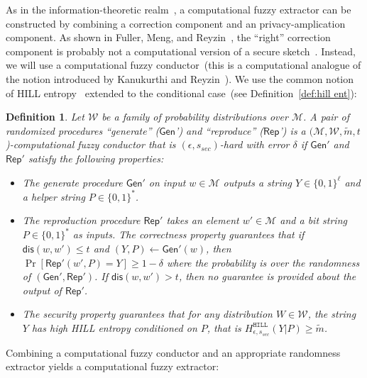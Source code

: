 \documentclass[11pt]{article}
\newcommand{\defref}[1]{\mbox{Definition~\ref{#1}}}
\newcommand{\class}[1]{{\ensuremath{\mathsf{#1}}}}
\newcommand{\gen}{\ensuremath{\class{Gen}}\xspace}
\newcommand{\rep}{\ensuremath{\class{Rep}}\xspace}
\newcommand{\dis}{\ensuremath{\mathsf{dis}}}
\newcommand{\hill}{\ensuremath{\mathtt{HILL}}\xspace}
\newtheorem{definition}[theorem]{Definition}
\begin{document}
As in the information-theoretic realm~\cite[Lemma 4.1]{DBLP:journals/siamcomp/DodisORS08}, a computational fuzzy extractor can be constructed by combining a correction component and an privacy-amplication component.  As shown in Fuller, Meng, and Reyzin~\cite[Corollary 3.8 and Theorem 3.10]{fuller2013computational}, the ``right'' correction component is probably not a computational version of a secure sketch~\cite[Definition 3]{DBLP:journals/siamcomp/DodisORS08}.  Instead, we will use a computational fuzzy conductor~(this is a computational analogue of the notion introduced by Kanukurthi and Reyzin~\cite{KanukurthiR09}).  We use the common notion of HILL entropy~\cite{DBLP:journals/siamcomp/HastadILL99} extended to the conditional case~(see \defref{def:hill ent}): 

\begin{definition}
\label{def:comp fuzzy cond}
Let $\mathcal{W}$ be a family of probability distributions over $\mathcal{M}$.  A pair of randomized procedures ``generate'' (\gen') and ``reproduce'' (\rep') is a $(\mathcal{M}, \mathcal{W}, \tilde{m}, t$)-computational fuzzy conductor that is $(\epsilon, s_{sec})$-hard with error $\delta$ if $\gen'$ and $\rep'$ satisfy the following properties:
\begin{itemize}
\item The generate procedure $\gen'$ on input $w\in \mathcal{M}$ outputs a string $Y\in\{0,1\}^\ell$ and a helper string $P\in\{0,1\}^*$.
\item The reproduction procedure $\rep'$ takes an element $w'\in\mathcal{M}$ and a bit string $P\in\{0,1\}^*$ as inputs.  The \emph{correctness} property guarantees that if $\dis(w, w')\leq t$ and $(Y, P)\leftarrow \gen'(w)$, then $\Pr[\rep'( w', P) = Y] \geq 1-\delta$ where the probability is over the randomness of $(\gen', \rep')$.  
If $\dis(w, w') > t$, then no guarantee is provided about the output of $\rep'$.
\item The \emph{security} property guarantees that for any distribution $W\in \mathcal{W}$, the string $Y$ has high HILL entropy conditioned on $P$, that is $H^{\hill}_{\epsilon, s_{sec}}(Y |P)\geq \tilde{m}$.
\end{itemize}
\end{definition}

Combining a computational fuzzy conductor and an appropriate randomness extractor yields a computational fuzzy extractor:
\end{document}

